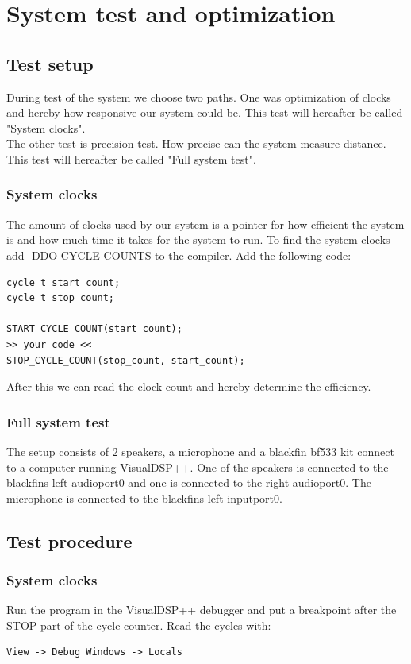 \chapter{System test and optimization}
\section{Test setup}
During test of the system we choose two paths. One was optimization of clocks and hereby how responsive our system could be. This test will hereafter be called "System clocks".\\
The other test is precision test. How precise can the system measure distance. This test will hereafter be called "Full system test".\\
\subsection{System clocks}
The amount of clocks used by our system is a pointer for how efficient the system is and how much time it takes for the system to run. To find the system clocks add -DDO$\_$CYCLE$\_$COUNTS to the compiler. Add the following code:\\
\begin{lstlisting}
cycle_t start_count;
cycle_t stop_count;
	
START_CYCLE_COUNT(start_count);
>> your code <<
STOP_CYCLE_COUNT(stop_count, start_count);
\end{lstlisting}
After this we can read the clock count and hereby determine the efficiency.
\subsection{Full system test}
The setup consists of 2 speakers, a microphone and a blackfin bf533 kit connect to a computer running VisualDSP++. One of the speakers is connected to the blackfins left audioport0 and one is connected to the right audioport0. The microphone is connected to the blackfins left inputport0. 

\section{Test procedure}
\subsection{System clocks}
Run the program in the VisualDSP++ debugger and put a breakpoint after the STOP part of the cycle counter. Read the cycles with:
\begin{verbatim}
View -> Debug Windows -> Locals
\end{verbatim}
